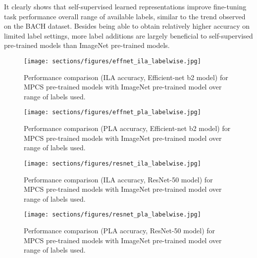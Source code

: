 \documentclass[conference]{IEEEtran}
\begin{document}
It clearly shows that self-supervised learned representations improve fine-tuning task performance overall range of available labels, similar to the trend observed on the BACH dataset. Besides being able to obtain relatively higher accuracy on limited label settings, more label additions are largely beneficial to self-supervised pre-trained models than ImageNet pre-trained models.
\begin{figure}[]
    \centering
    \texttt{[image: sections/figures/effnet\_ila\_labelwise.jpg]}
    \caption{Performance comparison (ILA accuracy, Efficient-net b2 model) for MPCS pre-trained models with ImageNet pre-trained model over range of labels used.}
    \label{fig:effnet_ila_compare}
\end{figure}
\begin{figure}[]
    \centering
    \texttt{[image: sections/figures/effnet\_pla\_labelwise.jpg]}
    \caption{Performance comparison (PLA accuracy, Efficient-net b2 model) for MPCS pre-trained models with ImageNet pre-trained model over range of labels used.}
    \label{fig:effnet_pla_compare}
\end{figure}
\begin{figure}[t]
    \centering
    \texttt{[image: sections/figures/resnet\_ila\_labelwise.jpg]}
    \caption{Performance comparison (ILA accuracy, ResNet-50 model) for MPCS pre-trained models with ImageNet pre-trained model over range of labels used.}
    \label{fig:resnet_ila_compare}
\end{figure}
\begin{figure}[t]
    \centering
    \texttt{[image: sections/figures/resnet\_pla\_labelwise.jpg]}
    \caption{Performance comparison (PLA accuracy, ResNet-50 model) for MPCS pre-trained models with ImageNet pre-trained model over range of labels used.}
    \label{fig:resnet_pla_compare}
\end{figure}
\end{document}
